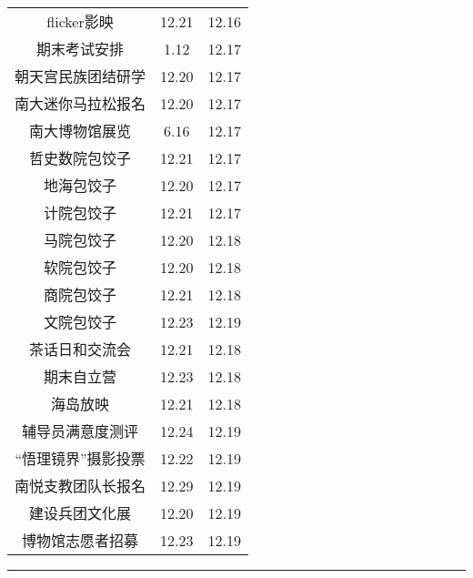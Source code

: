 \documentclass[letterpaper, 12pt]{article}
\begin{document}
\begin{multicols}{2}
{\begin{longtable}{|c|c|c|}
    flicker影映 & 12.21 & 12.16\\
    期末考试安排 & 1.12 & 12.17\\
    朝天宫民族团结研学 & 12.20 & 12.17\\
    南大迷你马拉松报名 & 12.20 & 12.17\\
    南大博物馆展览 & 6.16 & 12.17\\
    哲史数院包饺子 & 12.21 & 12.17\\
    地海包饺子 & 12.20 & 12.17\\
    计院包饺子 & 12.21 & 12.17\\
    马院包饺子 & 12.20 & 12.18\\
    软院包饺子 & 12.20 & 12.18\\
    商院包饺子 & 12.21 & 12.18\\
    文院包饺子 & 12.23 & 12.19\\
    茶话日和交流会 & 12.21 & 12.18\\
    期末自立营 & 12.23 & 12.18\\
    海岛放映 & 12.21 & 12.18\\
    辅导员满意度测评 & 12.24 & 12.19\\
    “悟理镜界”摄影投票 & 12.22 & 12.19\\
    南悦支教团队长报名 & 12.29 & 12.19\\
    建设兵团文化展 & 12.20 & 12.19\\
    博物馆志愿者招募 & 12.23 & 12.19\\
    
    \hline
\end{longtable}
\unskip
\unpenalty
\unpenalty}\unvbox\colbbox
\end{multicols}
\hrule
\pagebreak
\end{document}
